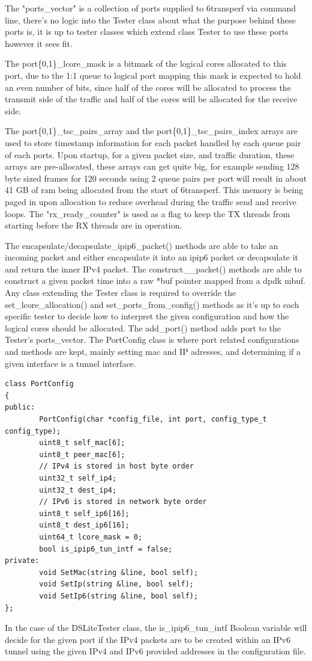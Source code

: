\documentclass[a4paper,12p]{article}
\begin{document}
The "ports\_vector" is a collection of ports supplied to 6transperf via command line, there’s no logic into the Tester class about what the purpose behind these ports is, it is up to tester classes which extend class Tester to use these ports however it sees fit.

The port\{0,1\}\_lcore\_mask is a bitmask of the logical cores allocated to this port, due to the 1:1 queue to logical port mapping this mask is expected to hold an even number of bits, since half of the cores will be allocated to process the transmit side of the traffic and half of the cores will be allocated for the receive side.

The port\{0,1\}\_tsc\_pairs\_array and the port\{0,1\}\_tsc\_pairs\_index arrays are used to store timestamp information for each packet handled by each queue pair of each ports. Upon startup, for a given packet size, and traffic duration, these arrays are pre-allocated, these arrays can get quite big, for example sending 128 byte sized frames for 120 seconds using 2 queue pairs per port will result in about 41 GB of ram being allocated from the start of 6transperf. This memory is being paged in upon allocation to reduce overhead during the traffic send and receive loops.
The "rx\_ready\_counter" is used as a flag to keep the TX threads from starting before the RX threads are in operation.

The encapsulate/decapsulate\_ipip6\_packet() methods are able to take an incoming packet and either encapsulate it into an ipip6 packet or decapsulate it and return the inner IPv4 packet.
The construct\_\*\_packet() methods are able to construct a given packet time into a raw *buf pointer mapped from a dpdk mbuf.
Any class extending the Tester class is required to override the set\_lcore\_allocation() and set\_ports\_from\_config() methods as it’s up to each specific tester to decide how to interpret the given configuration and how the logical cores should be allocated.
The add\_port() method adds port to the Tester’s ports\_vector.
The PortConfig class is where port related configurations and methods are kept, mainly setting mac and IP adresses, and determining if a given interface is a tunnel interface.

\begin{lstlisting}
class PortConfig
{
public:
        PortConfig(char *config_file, int port, config_type_t config_type);
        uint8_t self_mac[6];
        uint8_t peer_mac[6];
        // IPv4 is stored in host byte order
        uint32_t self_ip4;
        uint32_t dest_ip4;
        // IPv6 is stored in network byte order
        uint8_t self_ip6[16];
        uint8_t dest_ip6[16];
        uint64_t lcore_mask = 0;
        bool is_ipip6_tun_intf = false;
private:
        void SetMac(string &line, bool self);
        void SetIp(string &line, bool self);
        void SetIp6(string &line, bool self);
};
\end{lstlisting}
In the case of the DSLiteTester class, the is\_ipip6\_tun\_intf Boolean variable will decide for the given port if the IPv4 packets are to be created within an IPv6 tunnel using the given IPv4 and IPv6 provided addresses in the configuration file.
\end{document}
